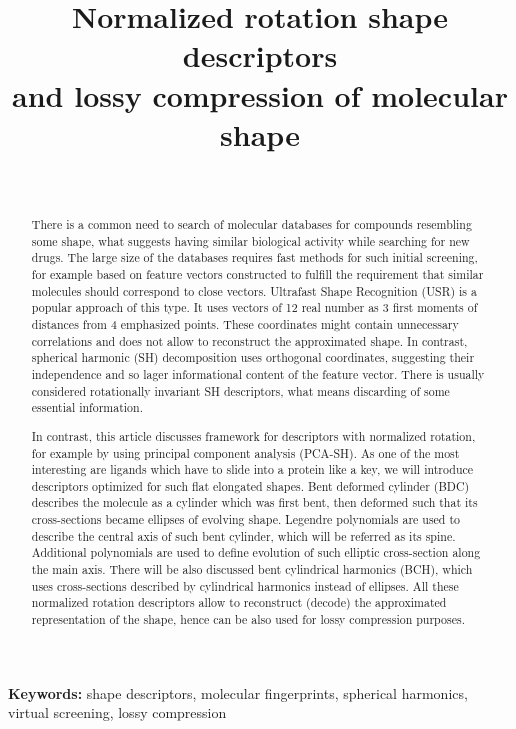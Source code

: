 \documentclass[10pt,journal]{IEEEtranTCOM}
\theoremstyle{plain}
\begin{document}
\newcommand{\bea}{}
\newcommand{\be}{}
\newcommand{\beas}{}
\newcommand{\bs}{\backslash}
\newcommand{\bc}{\begin{center}}
\newcommand{\ec}{\end{center}}
\def\SC {\mathscr{C}}

\title{Normalized rotation shape descriptors \\ and lossy compression of molecular shape}
\author{\\
}
\maketitle

\begin{abstract}
There is a common need to search of molecular databases for compounds resembling some shape, what suggests having similar biological activity while searching for new drugs.
The large size of the databases requires fast methods for such initial screening, for example based on feature vectors constructed to fulfill the requirement that similar molecules should correspond to close vectors.
Ultrafast Shape Recognition (USR) is a popular approach of this type. It uses vectors of 12 real number as 3 first moments of distances from 4 emphasized points. These coordinates might contain unnecessary correlations and does not allow to reconstruct the approximated shape. In contrast, spherical harmonic (SH) decomposition uses orthogonal coordinates, suggesting their independence and so lager informational content of the feature vector. There is usually considered rotationally invariant SH descriptors, what means discarding of some essential information.

In contrast, this article discusses framework for descriptors with normalized rotation, for example by using principal component analysis (PCA-SH).
As one of the most interesting are ligands which have to slide into a protein like a key, we will introduce descriptors optimized for such flat elongated shapes. Bent deformed cylinder (BDC) describes the molecule as a cylinder which was first bent, then deformed such that its cross-sections became ellipses of evolving shape. Legendre polynomials are used to describe the central axis of such bent cylinder, which will be referred as its spine. Additional polynomials are used to define evolution of such elliptic cross-section along the main axis. There will be also discussed bent cylindrical harmonics (BCH), which uses cross-sections described by cylindrical harmonics instead of ellipses. All these normalized rotation descriptors allow to reconstruct (decode) the approximated representation of the shape, hence can be also used for lossy compression purposes.
\end{abstract}
\textbf{Keywords:} shape descriptors, molecular fingerprints, spherical harmonics, virtual screening, lossy compression
\end{document}
